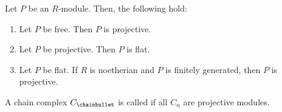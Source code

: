 \begin{lemma}
  Let $P$ be an  $R$-module.
  Then, the following hold:
   \begin{enumerate}[h]
     \item Let $P$ be free. Then  $P$ is projective.
     \item Let $P$ be projective. Then  $P$ is flat. 
     \item Let $P$ be flat. If  $R$ is noetherian and  $P$ is
       finitely generated, then  $P$ is projective.
  \end{enumerate}
\end{lemma}

\begin{definition}
  A chain complex $C_\chainbullet $ is called 
  if all $C_n$ are projective modules.
\end{definition}
